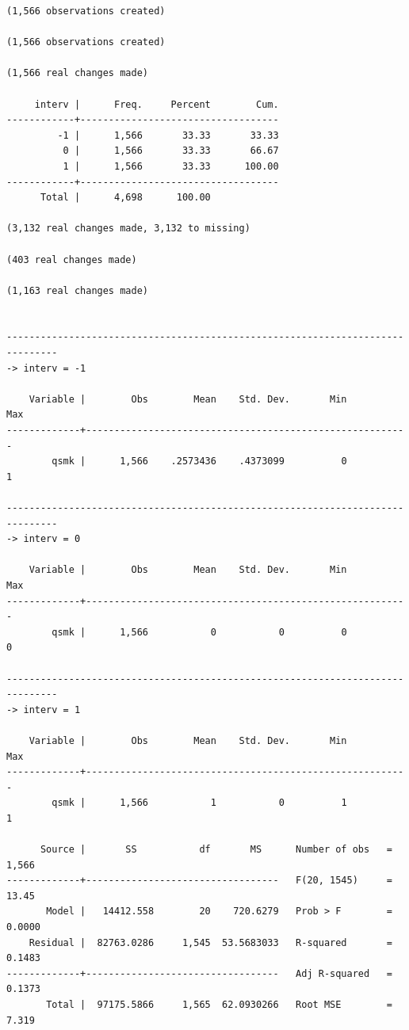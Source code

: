 \documentclass[
  10pt,
]{book}
\begin{document}
\begin{verbatim}
(1,566 observations created)

(1,566 observations created)

(1,566 real changes made)

     interv |      Freq.     Percent        Cum.
------------+-----------------------------------
         -1 |      1,566       33.33       33.33
          0 |      1,566       33.33       66.67
          1 |      1,566       33.33      100.00
------------+-----------------------------------
      Total |      4,698      100.00

(3,132 real changes made, 3,132 to missing)

(403 real changes made)

(1,163 real changes made)


-------------------------------------------------------------------------------
-> interv = -1

    Variable |        Obs        Mean    Std. Dev.       Min        Max
-------------+---------------------------------------------------------
        qsmk |      1,566    .2573436    .4373099          0          1

-------------------------------------------------------------------------------
-> interv = 0

    Variable |        Obs        Mean    Std. Dev.       Min        Max
-------------+---------------------------------------------------------
        qsmk |      1,566           0           0          0          0

-------------------------------------------------------------------------------
-> interv = 1

    Variable |        Obs        Mean    Std. Dev.       Min        Max
-------------+---------------------------------------------------------
        qsmk |      1,566           1           0          1          1

      Source |       SS           df       MS      Number of obs   =     1,566
-------------+----------------------------------   F(20, 1545)     =     13.45
       Model |   14412.558        20    720.6279   Prob > F        =    0.0000
    Residual |  82763.0286     1,545  53.5683033   R-squared       =    0.1483
-------------+----------------------------------   Adj R-squared   =    0.1373
       Total |  97175.5866     1,565  62.0930266   Root MSE        =     7.319


\end{verbatim}
\end{document}
